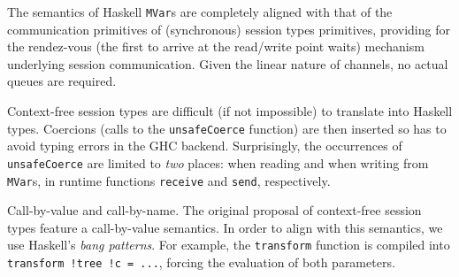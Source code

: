 The semantics of Haskell \lstinline|MVar|s are completely aligned with
that of the communication primitives of (synchronous) session types
primitives, providing for the rendez-vous (the first to arrive at the
read/write point waits) mechanism underlying session
communication. Given the linear nature of \freest{} channels, no
actual queues are required.

Context-free session types are difficult (if not impossible) to
translate into Haskell types. Coercions (calls to the
\lstinline|unsafeCoerce| function) are then inserted so has to avoid
typing errors in the GHC backend. Surprisingly, the occurrences of
\lstinline|unsafeCoerce| are limited to \emph{two} places: when reading
and when writing from \lstinline|MVar|s, in runtime functions
\lstinline|receive| and \lstinline|send|, respectively.

Call-by-value and call-by-name. The original proposal of context-free
session types feature a call-by-value semantics. In order to align
\freest{} with this semantics, we use Haskell's \emph{bang
  patterns}. For example, the \lstinline|transform| function is
compiled into \lstinline|transform !tree !c = ...|, forcing the
evaluation of both parameters.

